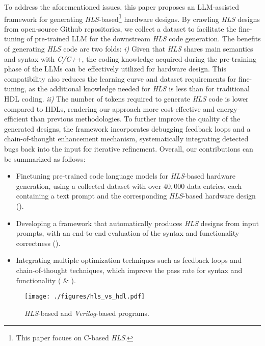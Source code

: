 To address the aforementioned issues, 
this paper proposes an LLM-assisted framework for generating \textit{HLS}-based\footnote{This paper focues on C-based \textit{HLS}.} hardware designs.
By crawling \textit{HLS} designs from open-source Github repositories,
we collect a dataset to facilitate the fine-tuning of pre-trained LLM for the downstream \textit{HLS} code generation.
The benefits of generating \textit{HLS} code are two folds:
\textit{i)} Given that \textit{HLS} shares main semantics and syntax with \textit{C/C++}, the coding knowledge acquired during the pre-training phase of the LLMs can be effectively utilized for hardware design. 
This compatibility also reduces the learning curve and dataset requirements for fine-tuning, as the additional knowledge needed for \textit{HLS} is less than for traditional HDL coding.
\textit{ii)} The number of tokens required to generate \textit{HLS} code is lower compared to HDLs, rendering our approach more cost-effective and energy-efficient than previous methodologies.
To further improve the quality of the generated designs, the framework incorporates debugging feedback loops and a chain-of-thought enhancement mechanism, systematically integrating detected bugs back into the input for iterative refinement. 
Overall, our contributions can be summarized as follows:

\begin{itemize}[leftmargin=*]
    \item Finetuning pre-trained code language models for \textit{HLS}-based hardware generation, using a collected dataset with over $40,000$ data entries, each containing a text prompt and the corresponding \textit{HLS}-based hardware design ().
    \item Developing a framework that automatically produces \textit{HLS} designs from input prompts, with an end-to-end evaluation of the syntax and functionality correctness (). 
    \item Integrating multiple optimization techniques such as feedback loops and chain-of-thought techniques, which improve the pass rate for syntax and functionality ( \& ).
\end{itemize}



\begin{figure}[t]
\centering
\texttt{[image: ./figures/hls\_vs\_hdl.pdf]}
\vspace{-5mm}
\caption{\textit{HLS}-based and \textit{Verilog}-based programs.}
\vspace{-7mm}
\label{fig:hls_vs_hdl}
\end{figure}

